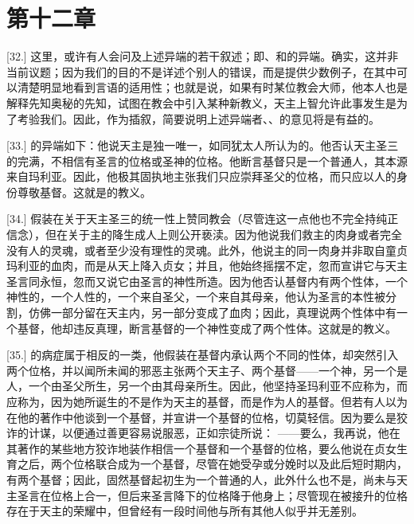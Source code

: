 
\section{第十二章}

\par

[32.] 这里，或许有人会问及上述异端的若干叙述；即、和的异端。确实，这并非当前议题；因为我们的目的不是详述个别人的错误，而是提供少数例子，在其中可以清楚明显地看到言语的适用性；也就是说，如果有时某位教会大师，他本人也是解释先知奥秘的先知，试图在教会中引入某种新教义，天主上智允许此事发生是为了考验我们。因此，作为插叙，简要说明上述异端者、、的意见将是有益的。\par

[33.] 的异端如下：他说天主是独一唯一，如同犹太人所认为的。他否认天主圣三的完满，不相信有圣言的位格或圣神的位格。他断言基督只是一个普通人，其本源来自玛利亚。因此，他极其固执地主张我们只应崇拜圣父的位格，而只应以人的身份尊敬基督。这就是的教义。\par

[34.] 假装在关于天主圣三的统一性上赞同教会（尽管连这一点他也不完全持纯正信念），但在关于主的降生成人上则公开亵渎。因为他说我们救主的肉身或者完全没有人的灵魂，或者至少没有理性的灵魂。此外，他说主的同一肉身并非取自童贞玛利亚的血肉，而是从天上降入贞女；并且，他始终摇摆不定，忽而宣讲它与天主圣言同永恒，忽而又说它由圣言的神性所造。因为他否认基督内有两个性体，一个神性的，一个人性的，一个来自圣父，一个来自其母亲，他认为圣言的本性被分割，仿佛一部分留在天主内，另一部分变成了血肉；因此，真理说两个性体中有一个基督，他却违反真理，断言基督的一个神性变成了两个性体。这就是的教义。\par

[35.] 的病症属于相反的一类，他假装在基督内承认两个不同的性体，却突然引入两个位格，并以闻所未闻的邪恶主张两个天主子、两个基督——一个神，另一个是人，一个由圣父所生，另一个由其母亲所生。因此，他坚持圣玛利亚不应称为，而应称为，因为她所诞生的不是作为天主的基督，而是作为人的基督。但若有人以为在他的著作中他谈到一个基督，并宣讲一个基督的位格，切莫轻信。因为要么是狡诈的计谋，以便通过善更容易说服恶，正如宗徒所说： ——要么，我再说，他在其著作的某些地方狡诈地装作相信一个基督和一个基督的位格，要么他说在贞女生育之后，两个位格联合成为一个基督，尽管在她受孕或分娩时以及此后短时期内，有两个基督；因此，固然基督起初生为一个普通的人，此外什么也不是，尚未与天主圣言在位格上合一，但后来圣言降下的位格降于他身上；尽管现在被接升的位格存在于天主的荣耀中，但曾经有一段时间他与所有其他人似乎并无差别。\par

